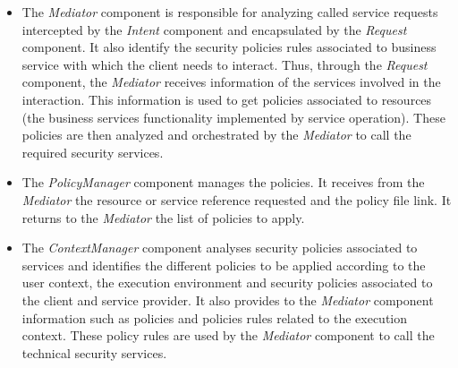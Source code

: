 \documentclass[runningheads,a4paper]{llncs}
\begin{document}
\begin{itemize}
\settowidth{\leftmargin}{{\Large$\square$}}\advance\leftmargin{}
\itemsep8pt\relax
\renewcommand\labelitemi{{\lower1.5pt\hbox{\Large$\square$}}}

\item The \emph{Mediator} component is responsible for analyzing called service requests intercepted by the  \emph{Intent} component and  encapsulated by the \emph{Request} component. It also identify the security policies rules associated to business service with which the client needs to interact. Thus, through the \emph{Request} component, the \emph{Mediator} receives information of the services involved in the interaction. This information is used to get policies associated to resources (the business services functionality implemented by service operation). These policies are then analyzed and orchestrated by the \emph{Mediator} to call the required security services.
\item The \emph{PolicyManager} component manages the policies. It receives from the \emph{Mediator} the resource or service reference requested and the policy file link. It returns to the \emph{Mediator} the list of policies to apply.
\item The \emph{ContextManager} component analyses security policies associated to services and identifies the different policies to be applied according to the user context, the execution environment and security policies associated to the client and service provider. It also provides to the \emph{Mediator} component information such as policies and policies rules related to the execution context. These policy rules are used by the \emph{Mediator} component to call the technical security services.
\end{itemize}
\end{document}
